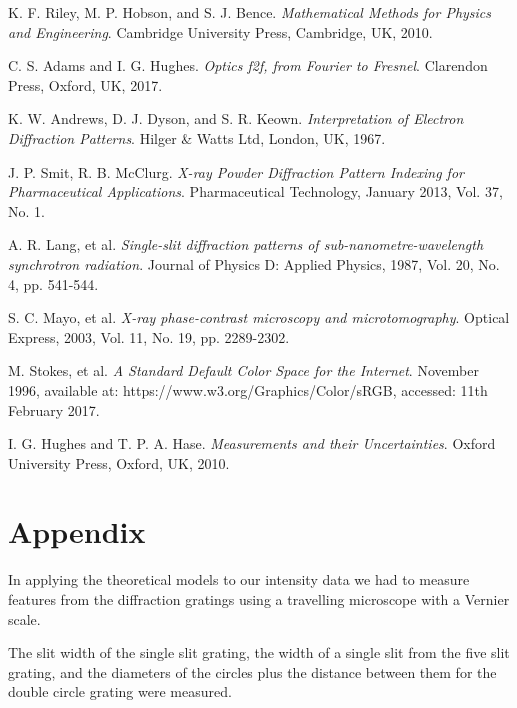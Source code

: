 \documentclass[twocolumn]{revtex4}
\begin{document}
\begin{thebibliography}{5}
	K. F. Riley, M. P. Hobson, and S. J. Bence.
	\textit{Mathematical Methods for Physics and Engineering}.
	Cambridge University Press, Cambridge, UK, 2010.
	
	C. S. Adams and I. G. Hughes.
	\textit{Optics f2f, from Fourier to Fresnel}.
	Clarendon Press, Oxford, UK, 2017.

	K. W. Andrews, D. J. Dyson, and S. R. Keown.
	\textit{Interpretation of Electron Diffraction Patterns}.
	Hilger \& Watts Ltd, London, UK, 1967.
	
	J. P. Smit, R. B. McClurg.	
	\textit{X-ray Powder Diffraction Pattern Indexing for Pharmaceutical Applications}.
	Pharmaceutical Technology, January 2013, Vol. 37, No. 1.
	
	A. R. Lang, et al.
	\textit{Single-slit diffraction patterns of sub-nanometre-wavelength synchrotron radiation}.
	Journal of Physics D: Applied Physics, 1987, Vol. 20, No. 4, pp. 541-544.
	
	S. C. Mayo, et al.
	\textit{X-ray phase-contrast microscopy and microtomography}.
	Optical Express, 2003, Vol. 11, No. 19, pp. 2289-2302.
	
	M. Stokes, et al.
	\textit{A Standard Default Color Space for the Internet}.
	November 1996, available at: https://www.w3.org/Graphics/Color/sRGB, accessed: 11th February 2017. 
	
	I. G. Hughes and T. P. A. Hase.
	\textit{Measurements and their Uncertainties}. 
	Oxford University Press, Oxford, UK, 2010.
	
\end{thebibliography}
\clearpage

\vfill
\twocolumngrid
\vspace{-3ex}
\section*{Appendix}
\vspace{-2ex}

In applying the theoretical models to our intensity data we had to measure features from the diffraction gratings using a travelling microscope with a Vernier scale. 

The slit width of the single slit grating, the width of a single slit from the five slit grating, and the diameters of the circles plus the distance between them for the double circle grating were measured.
\end{document}
